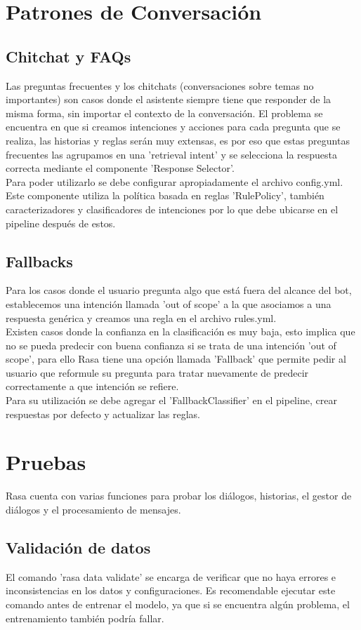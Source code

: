 \section{Patrones de Conversación}
\subsection{Chitchat y FAQs}
Las preguntas frecuentes y los chitchats (conversaciones sobre temas no importantes) son casos donde el asistente siempre tiene que responder de la misma forma, sin importar el contexto de la conversación. El problema se encuentra en que si creamos intenciones y acciones para cada pregunta que se realiza, las historias y reglas serán muy extensas, es por eso que estas preguntas frecuentes las agrupamos en una 'retrieval intent' y se selecciona la respuesta correcta mediante el componente 'Response Selector'.\\
Para poder utilizarlo se debe configurar apropiadamente el archivo config.yml. Este componente utiliza la política basada en reglas 'RulePolicy', también caracterizadores y clasificadores de intenciones por lo que debe ubicarse en el pipeline después de estos.
\subsection{Fallbacks}
Para los casos donde el usuario pregunta algo que está fuera del alcance del bot, establecemos una intención llamada 'out of scope' a la que asociamos a una respuesta genérica y creamos una regla en el archivo rules.yml.\\ Existen casos donde la confianza en la clasificación es muy baja, esto implica que no se pueda predecir con buena confianza si se trata de una intención 'out of scope', para ello Rasa tiene una opción llamada 'Fallback' que permite pedir al usuario que reformule su pregunta para tratar nuevamente de predecir correctamente a que intención se refiere. \\
Para su utilización se debe agregar el 'FallbackClassifier' en el pipeline, crear respuestas por defecto y actualizar las reglas.
\section{Pruebas}
Rasa cuenta con varias funciones para probar los diálogos, historias, el gestor de diálogos y el procesamiento de mensajes.
\subsection{Validación de datos}
El comando 'rasa data validate' se encarga de verificar que no haya errores e inconsistencias en los datos y configuraciones. Es recomendable ejecutar este comando antes de entrenar el modelo, ya que si se encuentra algún problema, el entrenamiento también podría fallar.
